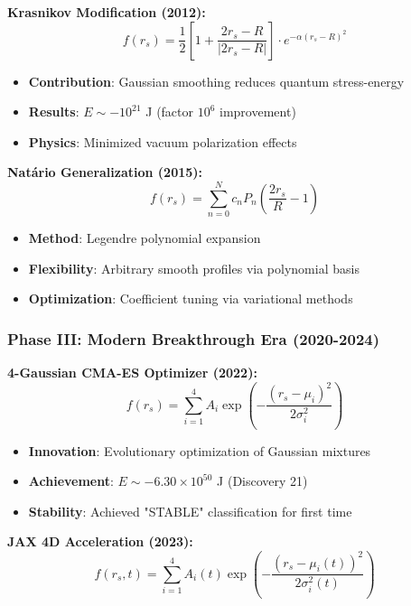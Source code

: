 \textbf{Krasnikov Modification (2012):}
\begin{equation}
f(r_s) = \frac{1}{2}\left[1 + \frac{2r_s - R}{|2r_s - R|}\right] \cdot e^{-\alpha(r_s - R)^2}
\end{equation}

\begin{itemize}
\item \textbf{Contribution}: Gaussian smoothing reduces quantum stress-energy
\item \textbf{Results}: $E \sim -10^{21}$ J (factor $10^6$ improvement)
\item \textbf{Physics}: Minimized vacuum polarization effects
\end{itemize}

\textbf{Natário Generalization (2015):}
\begin{equation}
f(r_s) = \sum_{n=0}^{N} c_n P_n\left(\frac{2r_s}{R} - 1\right)
\end{equation}

\begin{itemize}
\item \textbf{Method}: Legendre polynomial expansion
\item \textbf{Flexibility}: Arbitrary smooth profiles via polynomial basis
\item \textbf{Optimization}: Coefficient tuning via variational methods
\end{itemize}

\subsubsection{Phase III: Modern Breakthrough Era (2020-2024)}

\textbf{4-Gaussian CMA-ES Optimizer (2022):}
\begin{equation}
f(r_s) = \sum_{i=1}^{4} A_i \exp\left(-\frac{(r_s - \mu_i)^2}{2\sigma_i^2}\right)
\end{equation}

\begin{itemize}
\item \textbf{Innovation}: Evolutionary optimization of Gaussian mixtures
\item \textbf{Achievement}: $E \sim -6.30 \times 10^{50}$ J (Discovery 21)
\item \textbf{Stability}: Achieved "STABLE" classification for first time
\end{itemize}

\textbf{JAX 4D Acceleration (2023):}
\begin{equation}
f(r_s, t) = \sum_{i=1}^{4} A_i(t) \exp\left(-\frac{(r_s - \mu_i(t))^2}{2\sigma_i^2(t)}\right)
\end{equation}

